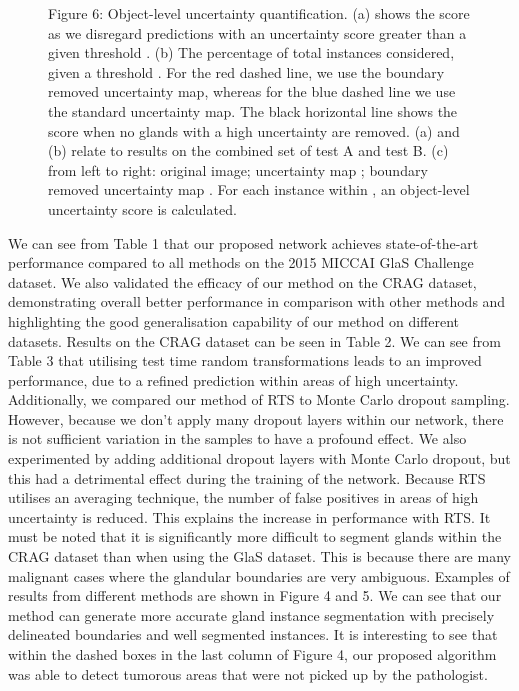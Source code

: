 \documentclass[3p]{elsarticle}
\begin{document}
\begin{figure}[!h]
\centering
\captionsetup[subfigure]{labelformat=empty}
\caption*{Figure 6: Object-level uncertainty quantification. (a) shows the  score as we disregard predictions with an uncertainty score  greater than a given threshold . (b) The percentage of total instances considered, given a threshold . For the red dashed line, we use the boundary removed uncertainty map, whereas for the blue dashed line we use the standard uncertainty map. The black horizontal line shows the  score when no glands with a high uncertainty are removed. (a) and (b) relate to results on the combined set of test A and test B. (c) from left to right: original image; uncertainty map ; boundary removed uncertainty map . For each instance  within , an object-level uncertainty score  is calculated. }
\end{figure}

We can see from Table 1 that our proposed network achieves state-of-the-art performance compared to all methods on the 2015 MICCAI GlaS Challenge dataset.
We also validated the efficacy of our method on the CRAG dataset, demonstrating overall better performance in comparison with other methods and highlighting the good generalisation capability of our method on different datasets. Results on the CRAG dataset can be seen in Table 2. We can see from Table 3 that utilising test time random transformations leads to an improved performance, due to a refined prediction within areas of high uncertainty. Additionally, we compared our method of RTS to Monte Carlo dropout sampling. However, because we don't apply many dropout layers within our network, there is not sufficient variation in the samples to have a profound effect. We also experimented by adding additional dropout layers with Monte Carlo dropout, but this had a detrimental effect during the training of the network. Because RTS utilises an averaging technique, the number of false positives in areas of high uncertainty is reduced. This explains the increase in performance with RTS. It must be noted that it is significantly more difficult to segment glands within the CRAG dataset than when using the GlaS dataset. This is because there are many malignant cases where the glandular boundaries are very ambiguous. Examples of results from different methods are shown in Figure 4 and 5. We can see that our method can generate more accurate gland instance segmentation with precisely delineated boundaries and well segmented instances. It is interesting to see that within the dashed boxes in the last column of Figure 4, our proposed algorithm was able to detect tumorous areas that were not picked up by the pathologist. 
\end{document}
